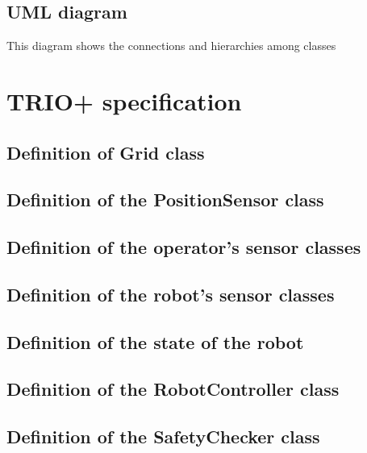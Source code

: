 \documentclass[a4paper]{article}
\begin{document}
\subsection{UML diagram}
This diagram shows the connections and hierarchies among classes
\clearpage
\section{TRIO+ specification}

\subsection{Definition of Grid class}


\pagebreak
\subsection{Definition of the PositionSensor class}


\pagebreak
\subsection{Definition of the operator's sensor classes}


\pagebreak



\pagebreak
\subsection{Definition of the robot's sensor classes}


\pagebreak


\pagebreak
\subsection{Definition of the state of the robot}


\pagebreak
\subsection{Definition of the RobotController class}


\pagebreak
\subsection{Definition of the SafetyChecker class}

\end{document}
